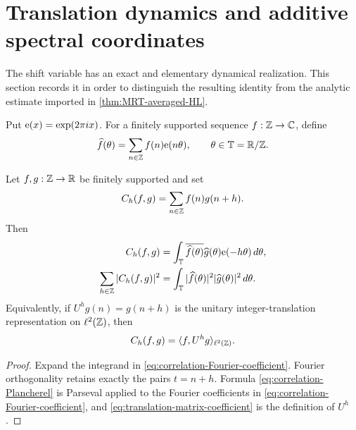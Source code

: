 \section{Translation dynamics and additive spectral coordinates}
\label{sec:spectral-density}

The shift variable has an exact and elementary dynamical realization.  This
section records it in order to distinguish the resulting identity from the
analytic estimate imported in \cref{thm:MRT-averaged-HL}.

Put $\mathrm e(x)=\exp(2\pi i x)$.  For a finitely supported sequence
$f:\mathbb Z\to\mathbb C$, define
\begin{equation}\label{eq:additive-Fourier-transform}
 \widehat f(\theta)=\sum_{n\in\mathbb Z}f(n)\mathrm e(n\theta),
 \qquad \theta\in\mathbb T=\mathbb R/\mathbb Z.
\end{equation}

\begin{proposition}
\label{prop:exact-correlation-spectrum}
Let $f,g:\mathbb Z\to\mathbb R$ be finitely supported and set
\begin{equation}\label{eq:generic-shift-correlation}
 C_h(f,g)=\sum_{n\in\mathbb Z}f(n)g(n+h).
\end{equation}
Then
\begin{align}
 C_h(f,g)
 &=\int_{\mathbb T}
   \overline{\widehat f(\theta)}\widehat g(\theta)
   \mathrm e(-h\theta)\,d\theta,
 \label{eq:correlation-Fourier-coefficient}\\
 \sum_{h\in\mathbb Z}|C_h(f,g)|^2
 &=\int_{\mathbb T}|\widehat f(\theta)|^2
                  |\widehat g(\theta)|^2\,d\theta.
 \label{eq:correlation-Plancherel}
\end{align}
Equivalently, if $U^h g(n)=g(n+h)$ is the unitary integer-translation
representation on $\ell^2(\mathbb Z)$, then
\begin{equation}\label{eq:translation-matrix-coefficient}
 C_h(f,g)=\langle f,U^h g\rangle_{\ell^2(\mathbb Z)}.
\end{equation}
\end{proposition}

\begin{proof}
Expand the integrand in \eqref{eq:correlation-Fourier-coefficient}.  Fourier
orthogonality retains exactly the pairs $t=n+h$.  Formula
\eqref{eq:correlation-Plancherel} is Parseval applied to the Fourier
coefficients in \eqref{eq:correlation-Fourier-coefficient}, and
\eqref{eq:translation-matrix-coefficient} is the definition of $U^h$.
\end{proof}

